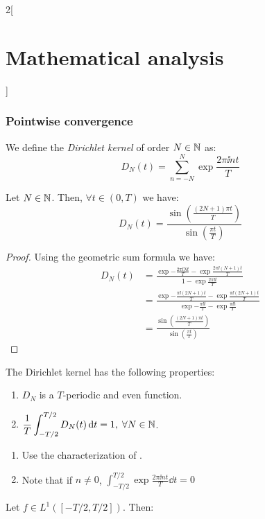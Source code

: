\documentclass[../../../main_math.tex]{subfiles}
\begin{document}
\begin{multicols}{2}[\section{Mathematical analysis}]
  \subsubsection{Pointwise convergence}
  \begin{definition}
    We define the \emph{Dirichlet kernel} of order $N\in\mathbb{N}$ as: $$D_N(t)=\sum_{n=-N}^N\exp{\frac{2\pi\ii nt}{T}}$$
  \end{definition}
  \begin{lemma}\label{MA:dirichletkernelchar}
    Let $N\in\mathbb{N}$. Then, $\forall t\in(0,T)$ we have:
    $$D_N(t)=\frac{\sin\left(\frac{(2N+1)\pi t}{T}\right)}{\sin\left(\frac{\pi t}{T}\right)}$$
  \end{lemma}
  \begin{proof}
    Using the geometric sum formula we have:
    \begin{align*}
      D_N(t) & =\frac{\exp{-\frac{2\pi\ii Nt}{T}}-\exp{\frac{2\pi\ii (N+1)t}{T}}}{1-\exp{\frac{2\pi\ii t}{T}}}                            \\
             & =\frac{\exp{-\frac{\pi\ii (2N+1)t}{T}}-\exp{\frac{\pi\ii (2N+1)t}{T}}}{\exp{-\frac{\pi\ii t}{T}}-\exp{\frac{\pi\ii t}{T}}} \\
             & =\frac{\sin\left(\frac{(2N+1)\pi t}{T}\right)}{\sin\left(\frac{\pi t}{T}\right)}
    \end{align*}
  \end{proof}
  \begin{proposition}
    The Dirichlet kernel has the following properties:
    \begin{enumerate}
      \item $D_N$ is a $T$-periodic and even function.
      \item $\displaystyle\frac{1}{T}\int_{-T/2}^{T/2}D_N(t)\dd{t}=1,\;\forall N\in\mathbb{N}$.
    \end{enumerate}
  \end{proposition}
  \begin{sproof}
    \begin{enumerate}
      \item Use the characterization of .
      \item Note that if $n\ne 0$, $\displaystyle\int_{-T/2}^{T/2} \exp{\frac{2\pi\ii nt}{T}}\dd{t}=0$
    \end{enumerate}
  \end{sproof}
  \begin{proposition}\label{MA:dirichletconvolution}
    Let $f\in L^1([-T/2,T/2])$. Then:

\end{proposition}
\end{multicols}
\end{document}
